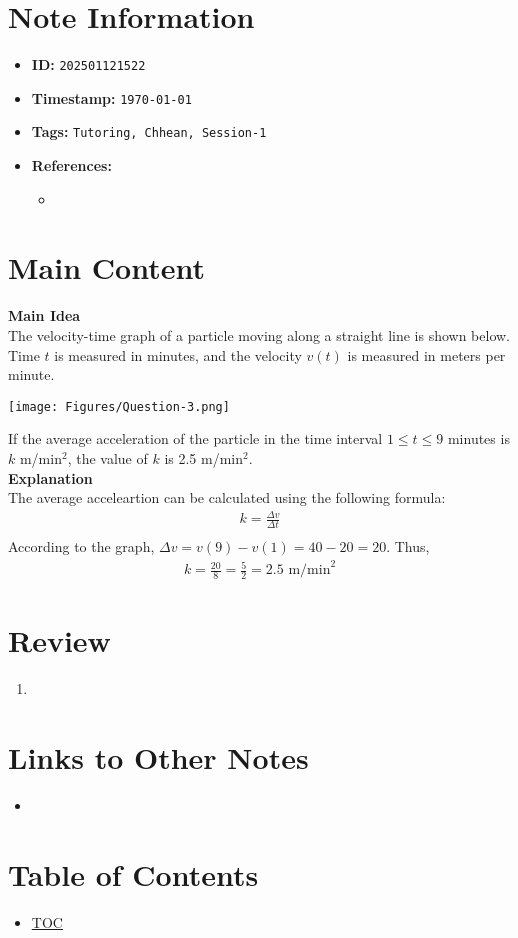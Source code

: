 \clearpage
{}
\label{202501121522}
\renewcommand{\notetitle}{Question-3}

\section*{Note Information}
\begin{itemize}
  \item \textbf{ID:} \texttt{202501121522}
  \item \textbf{Timestamp:} \texttt{\today \ \currenttime}
  \item \textbf{Tags:} \texttt{Tutoring, Chhean, Session-1}
  \item \textbf{References:}
    \begin{itemize}
      \item \href{}{}
    \end{itemize}
\end{itemize}


\section*{Main Content}
\textbf{Main Idea}\\
The velocity-time graph of a particle moving along a straight line is shown below. Time $t$ is measured in minutes, and the velocity $v(t)$ is measured in meters per minute.
\begin{center}
  \texttt{[image: Figures/Question-3.png]}
\end{center}
If the average acceleration of the particle in the time interval $1 \leq t \leq 9$ minutes is $k$ m/min$^2$, the value of $k$ is 2.5 m/min$^2$.\\
\textbf{Explanation}\\
The average acceleartion can be calculated using the following formula:
\begin{align*}
  k = \frac{\Delta v}{\Delta t}\\ 
\end{align*}
According to the graph, $\Delta v = v(9) - v(1) = 40-20 = 20$. Thus,
\begin{align*}
  k = \frac{20}{8} = \frac{5}{2} = 2.5 \text{ m/min}^2
\end{align*}


\section*{Review}
\begin{enumerate}
  \item 
\end{enumerate}


\section*{Links to Other Notes}
\begin{itemize}
  \item \hyperref[]{}
\end{itemize}

\section*{Table of Contents}

\begin{itemize}
  \item \hyperref[toc]{TOC}
\end{itemize}

